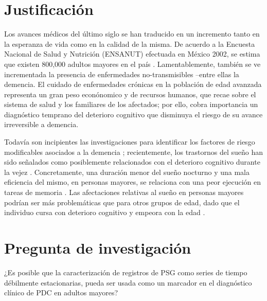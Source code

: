 \documentclass[12pt,a4paper]{mitthesis}
\begin{document}

\section{Justificaci\'on}

Los avances m\'edicos del \'ultimo siglo se han traducido en un incremento tanto en la esperanza de 
vida como en la calidad de la misma. 
De acuerdo a la Encuesta Nacional de Salud y Nutrici\'on (ENSANUT) efectuada en M\'exico 2002, se 
estima que existen 800,000 adultos mayores en el pa\'is \cite{Sosa12}. 
Lamentablemente, tambi\'en se ve incrementada la presencia de enfermedades no-transmisibles --entre 
ellas la demencia. 
El cuidado de enfermedades cr\'onicas en la poblaci\'on de edad avanzada representa un gran peso 
econ\'onomico y de recursos humanos, que recae sobre el sistema de salud y los familiares de los 
afectados; por ello, cobra importancia un diagn\'ostico temprano del deterioro cognitivo que 
disminuya el riesgo de su avance irreversible a demencia.

Todav\'ia son incipientes las investigaciones para identificar los factores de riesgo modificables 
asociados a la demencia \cite{PlanAlzheimer04}; recientemente, los trastornos del sue\~no han sido 
se\~nalados como posiblemente relacionados con el deterioro cognitivo durante la vejez 
\cite{Amer13,Miyata13,Potvin12}. Concretamente, una duraci\'on menor del sue\~no nocturno y una 
mala eficiencia del mismo, en personas mayores, se relaciona con una peor ejecuci\'on en tareas de 
memoria \cite{Reid06}. Las afectaciones relativas al sue\~no en personas mayores podr\'ian ser 
m\'as problem\'aticas que para otros grupos de edad, dado que el individuo cursa con deterioro 
cognitivo y empeora con la edad \cite{Potvin12}.


\section{Pregunta de investigaci\'on}

¿Es posible que la caracterizaci\'on de registros de PSG como series de tiempo d\'ebilmente 
estacionarias, pueda ser usada como un marcador en el diagn\'ostico cl\'inico de PDC en adultos 
mayores?
\end{document}

